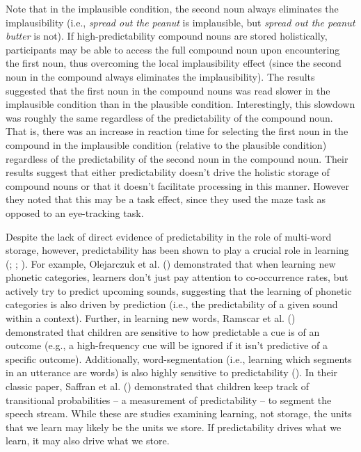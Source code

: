 \documentclass[
  12pt,
  letterpaper,
]{scrreport}
\begin{document}
\noindent Note that in the implausible condition, the second noun always
eliminates the implausibility (i.e., \emph{spread out the peanut} is
implausible, but \emph{spread out the peanut butter} is not). If
high-predictability compound nouns are stored holistically, participants
may be able to access the full compound noun upon encountering the first
noun, thus overcoming the local implausibility effect (since the second
noun in the compound always eliminates the implausibility). The results
suggested that the first noun in the compound nouns was read slower in
the implausible condition than in the plausible condition.
Interestingly, this slowdown was roughly the same regardless of the
predictability of the compound noun. That is, there was an increase in
reaction time for selecting the first noun in the compound in the
implausible condition (relative to the plausible condition) regardless
of the predictability of the second noun in the compound noun. Their
results suggest that either predictability doesn't drive the holistic
storage of compound nouns or that it doesn't facilitate processing in
this manner. However they noted that this may be a task effect, since
they used the maze task as opposed to an eye-tracking task.

Despite the lack of direct evidence of predictability in the role of
multi-word storage, however, predictability has been shown to play a
crucial role in learning
(;
; ). For example, Olejarczuk et al.
()
demonstrated that when learning new phonetic categories, learners don't
just pay attention to co-occurrence rates, but actively try to predict
upcoming sounds, suggesting that the learning of phonetic categories is
also driven by prediction (i.e., the predictability of a given sound
within a context). Further, in learning new words, Ramscar et al.
()
demonstrated that children are sensitive to how predictable a cue is of
an outcome (e.g., a high-frequency cue will be ignored if it isn't
predictive of a specific outcome). Additionally, word-segmentation
(i.e., learning which segments in an utterance are words) is also highly
sensitive to predictability
(). In their classic paper, Saffran et al.
()
demonstrated that children keep track of transitional probabilities -- a
measurement of predictability -- to segment the speech stream. While
these are studies examining learning, not storage, the units that we
learn may likely be the units we store. If predictability drives what we
learn, it may also drive what we store.
\end{document}
